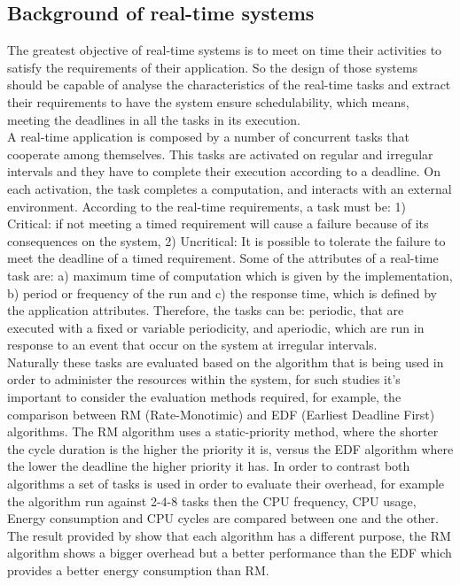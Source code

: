 \documentclass[conference]{IEEEtran}
\begin{document}
\subsection{Background of real-time systems}
The greatest objective of real-time systems is to meet on time their activities to satisfy the requirements of their application. So the design of those systems should be capable of analyse the characteristics of the real-time tasks and extract their requirements to have the system ensure schedulability, which means, meeting the deadlines in all the tasks in its execution. \cite{STAN01} \\
A real-time application is composed by a number of concurrent tasks that cooperate among themselves.  This tasks are activated  on regular and irregular intervals and they have to complete their execution according to a deadline. On each activation, the task completes a computation, and interacts with an external environment. According to the real-time requirements, a task must be: 1) Critical: if not meeting a timed requirement will cause a failure because of its consequences on the system, 2) Uncritical: It is possible to tolerate the failure to meet the deadline of a timed requirement. Some of the attributes of a real-time task are: a) maximum time of computation which is given by the implementation, b) period or frequency of the run and c) the response time, which is defined by the application attributes. Therefore, the tasks can be: periodic, that are executed with a fixed or variable periodicity, and aperiodic, which are run in response to an event that occur on the system at irregular intervals.\cite{AVI01} \\
Naturally these tasks are evaluated based on the algorithm that is being used in order to administer the resources within the system,  for such studies it's important to consider the evaluation methods required, for example, the comparison between RM (Rate-Monotimic) and EDF (Earliest Deadline First) algorithms.\cite{BECKER01} 
The RM algorithm uses a static-priority method, where the shorter the cycle duration is the higher the priority it is, versus the EDF algorithm where the lower the deadline the higher priority it has. 
In order to contrast both algorithms a set of tasks is used in order to evaluate their overhead, for example the algorithm run against 2-4-8 tasks then the CPU frequency, CPU usage, Energy consumption and CPU cycles are compared between one and the other. 
The result provided by  \cite{BECKER01} show that each algorithm has a different purpose, the RM algorithm shows a bigger overhead but a better performance than the EDF which provides a better energy consumption than RM. 
 
\end{document}
